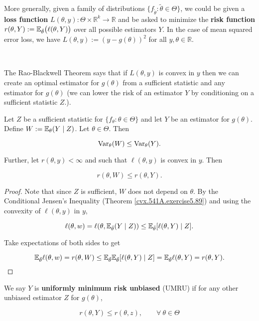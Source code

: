 More generally, given a family of distributions \(\{f_{\tilde{\theta}}: \tilde{\theta} \in \Theta\}\), we could be given a \textbf{loss function} \(L(\theta, y): \Theta \times \mathbb{R}^k \to \mathbb{R}\) and be asked to minimize the \textbf{risk function} \(r(\theta, Y) := \E_{\tilde{\theta}} \big( \ell(\theta, Y) \big)  \) over all possible estimators \(Y\). In the case of mean squared error loss, we have \(L(\theta,y) := (y - g(\theta))^2\) for all \(y, \theta \in \mathbb{R}\).

\

The Rao-Blackwell Theorem says that if \(L(\theta, y)\) is convex in \(y\) then we can create an optimal estimator for \(g(\theta)\) from a sufficient statistic and any estimator for \(g(\theta)\) (we can lower the risk of an estimator \(Y\) by conditioning on a sufficient statistic \(Z\).).

\begin{theorem} Let \(Z\) be a sufficient statistic for \(\{f_\theta:\theta \in \Theta\}\) and let \(Y\) be an estimator for \(g(\theta)\). Define \(W:= \E_\theta(Y \mid Z)\). Let \(\theta \in \Theta\). Then



\[
\Var_\theta(W) \leq \Var_\theta (Y).
\]

Further, let \(r(\theta, y) < \infty\) and such that \(\ell(\theta, y)\) is convex in \(y\). Then

\[
r(\theta, W) \leq r(\theta, Y).
\]

\end{theorem}

\begin{proof} Note that since \(Z\) is sufficient, \(W\) does not depend on \(\theta\). By the Conditional Jensen's Inequality (Theorem \ref{cvx.541A.exercise5.89}) and using the convexity of \(\ell(\theta, y)\) in \(y\),

\[
\ell(\theta, w) = \ell(\theta, \E_{\tilde{\theta}}(Y \mid Z)) \leq \E_{\tilde{\theta}} [ \ell(\theta, Y) \mid Z].
\]

Take expectations of both sides to get

\[
\E_{\tilde{\theta}} \ell(\theta, w) =  r(\theta, W)  \leq \E_{\tilde{\theta}} \E_{\tilde{\theta}} [ \ell(\theta, Y) \mid Z] = \E_{\tilde{\theta}} \ell(\theta, Y) = r(\theta, Y).
\]

\end{proof}

\begin{definition}We say \(Y\) is \textbf{uniformly minimum risk unbiased} (UMRU) if for any other unbiased estimator \(Z\) for \(g(\theta)\),

\[
r(\theta, Y) \leq r(\theta, z), \qquad \forall \ \theta \in \Theta
\]

\end{definition}

